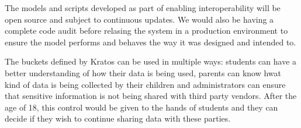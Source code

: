 \documentclass{article}
\begin{document}
\bigbreak
The models and scripts developed as part of enabling interoperability will be open source and subject to continuous updates. We would also be having a complete code audit before relasing the system in a production environment to ensure the model performs and behaves the way it was designed and intended to.

\bigbreak
The buckets defined by Kratos can be used in multiple ways: students can have a better understanding of how their data is being used, parents can know hwat kind of data is being collected by their children and administrators can ensure that sensitive information is not being shared with third party vendors. After the age of 18, this control would be given to the hands of students and they can decide if they wish to continue sharing data with these parties.
\end{document}
